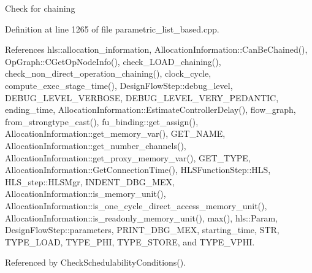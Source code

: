 Check for chaining 

Definition at line 1265 of file parametric\+\_\+list\+\_\+based.\+cpp.



References hls\+::allocation\+\_\+information, Allocation\+Information\+::\+Can\+Be\+Chained(), Op\+Graph\+::\+C\+Get\+Op\+Node\+Info(), check\+\_\+\+L\+O\+A\+D\+\_\+chaining(), check\+\_\+non\+\_\+direct\+\_\+operation\+\_\+chaining(), clock\+\_\+cycle, compute\+\_\+exec\+\_\+stage\+\_\+time(), Design\+Flow\+Step\+::debug\+\_\+level, D\+E\+B\+U\+G\+\_\+\+L\+E\+V\+E\+L\+\_\+\+V\+E\+R\+B\+O\+SE, D\+E\+B\+U\+G\+\_\+\+L\+E\+V\+E\+L\+\_\+\+V\+E\+R\+Y\+\_\+\+P\+E\+D\+A\+N\+T\+IC, ending\+\_\+time, Allocation\+Information\+::\+Estimate\+Controller\+Delay(), flow\+\_\+graph, from\+\_\+strongtype\+\_\+cast(), fu\+\_\+binding\+::get\+\_\+assign(), Allocation\+Information\+::get\+\_\+memory\+\_\+var(), G\+E\+T\+\_\+\+N\+A\+ME, Allocation\+Information\+::get\+\_\+number\+\_\+channels(), Allocation\+Information\+::get\+\_\+proxy\+\_\+memory\+\_\+var(), G\+E\+T\+\_\+\+T\+Y\+PE, Allocation\+Information\+::\+Get\+Connection\+Time(), H\+L\+S\+Function\+Step\+::\+H\+LS, H\+L\+S\+\_\+step\+::\+H\+L\+S\+Mgr, I\+N\+D\+E\+N\+T\+\_\+\+D\+B\+G\+\_\+\+M\+EX, Allocation\+Information\+::is\+\_\+memory\+\_\+unit(), Allocation\+Information\+::is\+\_\+one\+\_\+cycle\+\_\+direct\+\_\+access\+\_\+memory\+\_\+unit(), Allocation\+Information\+::is\+\_\+readonly\+\_\+memory\+\_\+unit(), max(), hls\+::\+Param, Design\+Flow\+Step\+::parameters, P\+R\+I\+N\+T\+\_\+\+D\+B\+G\+\_\+\+M\+EX, starting\+\_\+time, S\+TR, T\+Y\+P\+E\+\_\+\+L\+O\+AD, T\+Y\+P\+E\+\_\+\+P\+HI, T\+Y\+P\+E\+\_\+\+S\+T\+O\+RE, and T\+Y\+P\+E\+\_\+\+V\+P\+HI.



Referenced by Check\+Schedulability\+Conditions().

